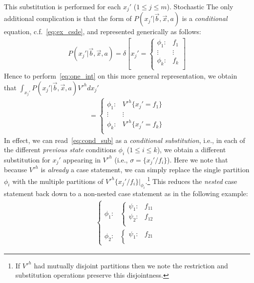 \documentclass[letterpaper]{article}
\renewcommand{\-}{\text{-}}
\begin{document}
\begin{enumerate}
This substitution is performed for each $x_j'$ ($1 \leq j \leq m$). Stochastic   The only
additional complication is that the form of 
$P(x_j'|\vec{b},\vec{x},a)$ is a \emph{conditional} 
equation, c.f.~\eqref{eq:ex_csde}, and represented generically
as follows:
\begin{align}
   P(x_j'|\vec{b},\vec{x},a) = \delta\left[ x_j' = \begin{cases}
    \phi_1: & f_1 \\ 
   \vdots&\vdots\\ 
    \phi_k: & f_k \\ 
  \end{cases} \right] \label{eq:cond_sub}
\end{align}
Hence to perform~\eqref{eq:one_int} on this more general
representation, we obtain that $\int_{x_j'} P(x_j'|\vec{b},\vec{x},a) V'^{h} dx_j'$
\begin{align*}
    = \begin{cases}
    \phi_1: & V'^{h} \{ x_j' = f_1 \} \\ 
   \vdots&\vdots\\ 
    \phi_k: & V'^{h} \{ x_j' = f_k \}  \\ 
  \end{cases}
\end{align*}
In effect, we can read~\eqref{eq:cond_sub} as a \emph{conditional
substitution}, i.e., in each of the different \emph{previous state}
conditions $\phi_i$ ($1 \leq i \leq k$), we obtain a different
substitution for $x_j'$ appearing in $V'^{h}$ (i.e., $\sigma = \{ x_j' / f_i
\}$).  Here we note that because $V'^{h}$ is \emph{already} a case
statement, we can simply replace the single partition $\phi_i$ with the
multiple partitions of $V'^h \{ x_j' / f_i \}|_{\phi_i}$.\footnote{If $V'^h$
had mutually disjoint partitions then we note the restriction and
substitution operations preserve this disjointness.}  This reduces
the \emph{nested} case statement back down to a non-nested case
statement as in the following example:
\begin{align*}
    \begin{cases}
      \phi_1: & 
        \begin{cases}
          \psi_1: & f_{11} \\ 
          \psi_2: & f_{12}  \\ 
        \end{cases} \\
      \phi_2: & 
        \begin{cases}
          \psi_1: & f_{21} \\ 

\end{cases}
\end{cases}
\end{align*}
\end{enumerate}
\end{document}
